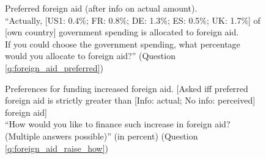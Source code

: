 \documentclass[12pt,english]{article}
\begin{document}
\begin{figure}[h!]
    \caption[Preferred foreign aid (after info on actual amount)]{Preferred foreign aid (after info on actual amount). \\ ``Actually,
    [US1: 0.4\%; FR: 0.8\%; DE: 1.3\%; ES: 0.5\%; UK: 1.7\%] of [own country] government spending is allocated to foreign aid. \\
    If you could choose the government spending, what percentage would you allocate
    to foreign aid?'' (Question \ref{q:foreign_aid_preferred})}\label{fig:foreign_aid_preferred_info}
\end{figure}

\begin{figure}[h!]
    \caption[Preferences for funding increased foreign aid]{Preferences for funding increased foreign aid. [Asked iff preferred foreign aid is strictly greater than [Info: actual; No info: perceived] foreign aid] \\ ``How would you like to finance such increase in foreign aid? (Multiple answers possible)'' (in percent) (Question \ref{q:foreign_aid_raise_how})}\label{fig:foreign_aid_raise_how}
\end{figure}
\end{document}
